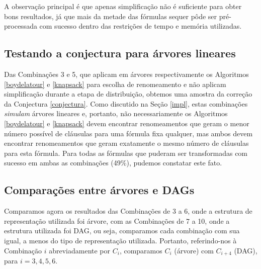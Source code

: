 A observação principal é que apenas simplificação não é suficiente para obter bons resultados, já que mais da metade das fórmulas sequer pôde ser pré-processada com sucesso dentro das restrições de tempo e memória utilizadas.

\subsection{Testando a conjectura para árvores lineares}

\indent

Das Combinações 3 e 5, que aplicam em árvores respectivamente os Algoritmos \ref{boydelatour} e \ref{knapsack} para escolha de renomeamento e não aplicam simplificação durante a etapa de distribuição, obtemos uma amostra da correção da Conjectura \ref{conjectura}. Como discutido na Seção \ref{impl}, estas combinações \emph{simulam} árvores lineares e, portanto, não necessariamente os Algoritmos \ref{boydelatour} e \ref{knapsack} devem encontrar renomeamentos que geram o menor número possível de cláusulas para uma fórmula fixa qualquer, mas ambos devem encontrar renomeamentos que geram exatamente o mesmo número de cláusulas para esta fórmula. Para todas as fórmulas que puderam ser transformadas com sucesso em ambas as combinações (49\%), pudemos constatar este fato.

\subsection{Comparações entre árvores e DAGs}

\indent

Comparamos agora os resultados das Combinações de 3 a 6, onde a estrutura de representação utilizada foi árvore, com as Combinações de 7 a 10, onde a estrutura utilizada foi DAG, ou seja, comparamos cada combinação com sua igual, a menos do tipo de representação utilizada. Portanto, referindo-nos à Combinação $i$ abreviadamente por $C_i$, comparamos $C_i$ (árvore) com $C_{i+4}$ (DAG), para $i=3,4,5,6$.

